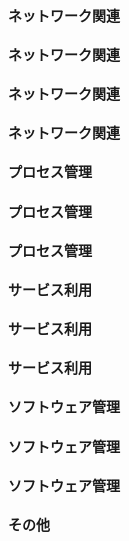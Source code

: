 \paragraph{ネットワーク関連}

\paragraph{ネットワーク関連}

\paragraph{ネットワーク関連}

\paragraph{ネットワーク関連}

\paragraph{プロセス管理}

\paragraph{プロセス管理}

\paragraph{プロセス管理}

\paragraph{サービス利用}

\paragraph{サービス利用}

\paragraph{サービス利用}

\paragraph{ソフトウェア管理}

\paragraph{ソフトウェア管理}

\paragraph{ソフトウェア管理}

\paragraph{その他}
